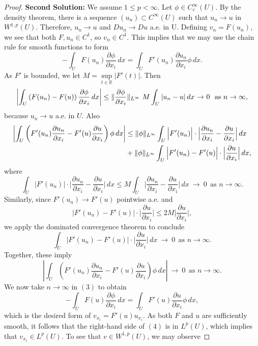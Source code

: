 \documentclass{article}
\DeclarePairedDelimiter{\norm}{\lVert}{\rVert}
\begin{document}
\begin{flushleft}
\begin{proof}
\textbf{Second Solution:} We assume $1\le p < \infty$. Let $\phi\in C_c^{\infty}(U)$. By the density theorem, there is a sequence $(u_n)\subset C^{\infty}(U)$ such that $u_n\to u$ in $W^{1,p}(U)$. Therefore, $u_n\to u$ and $Du_n \to Du$ a.e. in U. Defining $v_n=F(u_n)$, we see that both $F,u_n \in C^1$, so $v_n\in C^1$. This implies that we may use the chain rule for smooth functions to form
\begin{equation}-\int_U F(u_n)\frac{\partial \phi}{\partial x_i}\,dx = \int_U F'(u_n)\frac{\partial u_n}{\partial x_i}\phi\,dx.\end{equation}
As $F'$ is bounded, we let $M=\underset{t\in\mathbb R}\sup|F'(t)|$. Then
$$\left|\int_U \left(F(u_n)-F(u)\right)\frac{\partial \phi}{\partial x_i}\,dx\right|\le \norm{\frac{\partial \phi}{\partial x_i}}_{L^{\infty}} ~M \int_U |u_n - u|\,dx~ {\to}~ 0~~\text{as $n\to\infty$},$$
because $u_n \to u$ a.e. in $U$. Also
\begin{align*}
    \left|\int_U \left(F'(u_n)\frac{\partial u_n}{\partial x_i}-F'(u)\frac{\partial u}{\partial x_i}\right)\phi\,dx\right|&\le
    \norm{\phi}_{L^{\infty}}\int_U \Big|F'(u_n)\Big|\cdot\Big|\frac{\partial u_n}{\partial x_i} - \frac{\partial u}{\partial x_i}\Big|\,dx \\&+
    \norm{\phi}_{L^{\infty}}\int_U \Big|F'(u_n)-F'(u)\Big|\cdot\Big|\frac{\partial u}{\partial x_i}\Big|\,dx,
\end{align*}
where
$$\int_U \Big|F'(u_n)\Big|\cdot\Big|\frac{\partial u_n}{\partial x_i} - \frac{\partial u}{\partial x_i}\Big|\,dx  \le M \int_U \Big|\frac{\partial u_n}{\partial x_i} - \frac{\partial u}{\partial x_i}\Big|\,dx~ {\to}~ 0~~\text{as $n\to\infty$}.$$
Similarly, since $F'(u_n) \to F'(u)$ pointwise a.e. and 
$$\Big|F'(u_n)-F'(u)\Big|\cdot\Big|\frac{\partial u}{\partial x_i}\Big|\le 2M \Big|\frac{\partial u}{\partial x_i}\Big|,$$
we apply the dominated convergence theorem to conclude
$$\int_U \Big|F'(u_n)-F'(u)\Big|\cdot\Big|\frac{\partial u}{\partial x_i}\Big|\,dx ~ {\to}~ 0~~\text{as $n\to\infty$}.$$
Together, these imply
$$ \left|\int_U \left(F'(u_n)\frac{\partial u_n}{\partial x_i}-F'(u)\frac{\partial u}{\partial x_i}\right)\phi\,dx\right|~ {\to}~ 0~~\text{as $n\to\infty$}.$$
We now take $n\to\infty$ in $(3)$ to obtain
\begin{equation}-\int_U F(u)\frac{\partial \phi}{\partial x_i}\,dx = \int_U F'(u)\frac{\partial u}{\partial x_i}\phi\,dx,\end{equation}
which is the desired form of $v_{x_i}=F'(u)u_{x_i}$. As both $F$ and $u$ are sufficiently smooth, it follows that the right-hand side of $(4)$ is in $L^p(U)$, which implies that $v_{x_i}\in L^p(U)$. To see that $v\in W^{1,p}(U)$, we may observe

\end{proof}
\end{flushleft}
\end{document}
